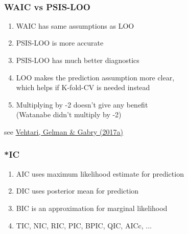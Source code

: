 \documentclass[10pt]{beamer}
\begin{document}
\begin{frame}{}
  \\

\end{frame}

\begin{frame}{}

\frametitle{ WAIC vs PSIS-LOO}

\begin{enumerate}
  \item<2-> WAIC has same assumptions as LOO
  \item<3-> PSIS-LOO is more accurate
  \item<4-> PSIS-LOO has much better diagnostics
  \item<5-> LOO makes the prediction assumption more clear,\\ which
    helps if K-fold-CV is needed instead
  \item<6-> Multiplying by -2 doesn't give any benefit\\ (Watanabe
    didn't multiply by -2)
\end{enumerate}

\vspace{6\baselineskip}
{\small see \href{http://link.springer.com/article/10.1007/s11222-016-9696-4}{Vehtari, Gelman \& Gabry (2017a)}}
\end{frame}

\begin{frame}{}

\frametitle{ *IC}

\begin{enumerate}
  \item AIC uses maximum likelihood estimate for prediction
  \item DIC uses posterior mean for prediction
  \item BIC is an approximation for marginal likelihood
  \item TIC, NIC, RIC, PIC, BPIC, QIC, AICc, ...
\end{enumerate}

\end{frame}
\end{document}

